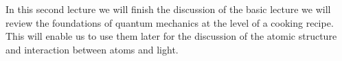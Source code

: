 In this second lecture we will finish the discussion of the basic lecture we will review the foundations of quantum mechanics at the level of a cooking recipe. This will enable us to use them later for the discussion of the atomic structure and interaction between atoms and light.
